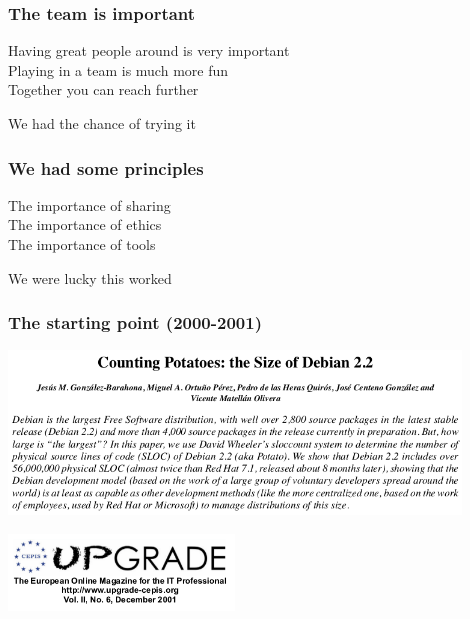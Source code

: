 \documentclass[17pt,aspectratio=169,hyperref=pdfusetitle]{beamer}
\begin{document}
\begin{frame}[fragile]
  \frametitle{The team is important}

  Having great people around is very important \\
  Playing in a team is much more fun \\
  Together you can reach further \\
  
  \begin{center}
    We had the chance of trying it
  \end{center}  
  
\end{frame}


\begin{frame}[fragile]
  \frametitle{We had some principles}

  The importance of sharing \\
  The importance of ethics \\
  The importance of tools \\

  \begin{center}
    We were lucky this worked
  \end{center}
\end{frame}


\begin{frame}[fragile]
  \frametitle{The starting point (2000-2001)}

  \begin{center}
  \includegraphics[width=12cm]{figs/counting-potatos}

  \includegraphics[width=6cm]{figs/upgrade}
  \end{center}  
  
\end{frame}
\end{document}
